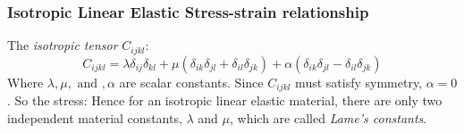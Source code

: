 \documentclass[notes]{beamer}
\begin{document}
\begin{frame}
\frametitle{Isotropic Linear Elastic Stress-strain relationship}
The \textit{isotropic tensor} $C_{ijkl}$:
\begin{equation*}
C_{ijkl} = \lambda \delta_{ij}\delta_{kl} + \mu (\delta_{ik}\delta_{jl} + \delta_{il}\delta_{jk}) + \alpha (\delta_{ik}\delta_{jl} - \delta_{il}\delta_{jk})
\end{equation*}
Where $\lambda, \mu, \text{ and }, \alpha$ are scalar constants. Since $C_{ijkl}$ must satisfy symmetry, $\alpha = 0$.
So the stress:
Hence for an isotropic linear elastic material, there are only two independent material constants, $\lambda$ and $\mu$, which are called \textit{Lame's constants}.
\end{frame}
\end{document}
